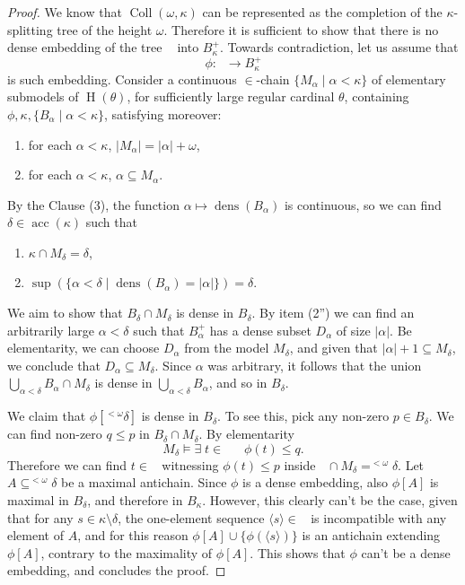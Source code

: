 \documentclass[11pt]{amsart}
\theoremstyle{definition}
\DeclareMathOperator{\acc}{acc}
\DeclareMathOperator{\dens}{dens}
\DeclareMathOperator{\kappatree}{^{<\omega}\kappa}
\newcommand{\s}{\subseteq}
\newcommand{\collkappa}{\operatorname{Coll}(\omega,\kappa)}
\begin{document}
\begin{proof}
    We know that $\collkappa$ can be represented as the completion of the $\kappa$-splitting tree of the height $\omega$. Therefore it is sufficient to show that there is no dense embedding of the tree $\kappatree$ into $B_\kappa^+$. Towards contradiction, let us assume that 
    $$\phi: \kappatree \longrightarrow B_\kappa^+$$
    is such embedding. Consider a continuous $\in$-chain $\{M_\alpha \mid \alpha<\kappa\}$ of elementary submodels of $\operatorname{H}(\theta)$, for sufficiently large regular cardinal $\theta$, containing $\phi,\kappa, \{B_\alpha \mid \alpha<\kappa\}$, satisfying moreover:
    \begin{enumerate}
        \item[(1')] for each $\alpha<\kappa$, $|M_\alpha|=|\alpha|+\omega$,
        \item[(2')] for each $\alpha<\kappa$, $\alpha\s M_\alpha$.
    \end{enumerate}

    By the Clause (3), the function $\alpha \mapsto \dens (B_\alpha)$ is continuous, so we can find $\delta\in \acc(\kappa)$ such that
    \begin{enumerate}
        \item[(1'')] $\kappa \cap M_\delta = \delta$,
        \item[(2'')] $\sup(\{\alpha<\delta \mid \dens(B_\alpha)=|\alpha|\})=\delta.$
    \end{enumerate}

   We aim to show that $B_\delta \cap M_\delta$ is dense in $B_\delta$. By item (2'') we can find an arbitrarily large $\alpha<\delta$ such that $B_\alpha^+$ has a dense subset $D_\alpha$ of size $|\alpha|$. Be elementarity, we can choose $D_\alpha$ from the model $M_\delta$, and given that $|\alpha|+1 \s M_\delta$, we conclude that $D_\alpha \s M_\delta$. Since $\alpha$ was arbitrary, it follows that the union $\displaystyle\bigcup_{\alpha<\delta}B_\alpha \cap M_\delta$ is dense in $\displaystyle\bigcup_{\alpha<\delta}B_\alpha$, and so in $B_\delta$.

   We claim that $\phi[^{<\omega}\delta]$ is dense in $B_\delta$. To see this, pick any non-zero $p\in B_\delta$. We can find non-zero $q\le p$ in $B_\delta\cap M_\delta$.  By elementarity
    $$M_\delta\models \exists\; t \in \kappatree \quad \phi(t) \le q.$$
    Therefore we can find $t \in \kappatree$ witnessing $\phi(t)\le p$ inside $\kappatree \cap M_\delta = ^{<\omega}\delta$. Let $A\s ^{<\omega}\delta$ be a maximal antichain. Since $\phi$ is a dense embedding, also $\phi[A]$ is maximal in $B_\delta$, and therefore in $B_\kappa$. However, this clearly can't be the case, given that for any $s \in \kappa \setminus \delta$, the  one-element sequence $\langle s \rangle \in \kappatree$ is incompatible with any element of $A$, and for this reason $\phi[A] \cup \{ \phi(\langle s \rangle)\}$ is an antichain extending $\phi[A]$, contrary to the maximality of $\phi[A]$. This shows that $\phi$ can't be a dense embedding, and concludes the proof.
\end{proof}
\end{document}
